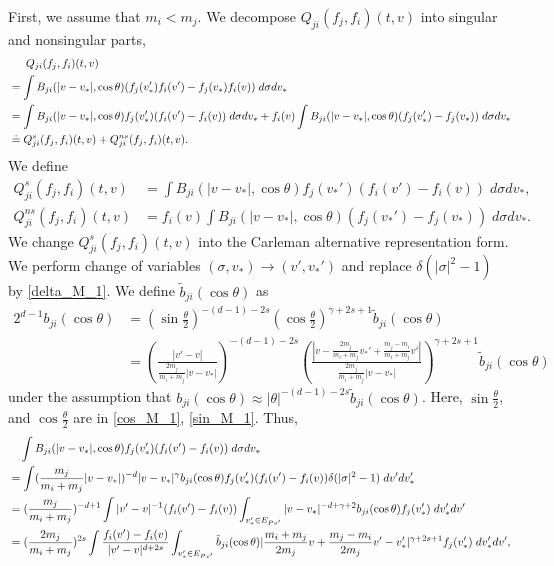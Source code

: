 \documentclass[reqno,10pt]{amsart}
\numberwithin{equation}{section}
\begin{document}
\noindent First, we assume that $m_i<m_j.$ We decompose $Q_{ji}(f_j,f_i)(t,v)$ into singular and nonsingular parts,
\begin{align} 
& \quad\;\; Q_{ji}(f_j,f_i)(t,v) \notag \\  &= \int B_{ji}(|v-v_*|,\cos\theta)(f_j(v_*')f_i(v')-f_j(v_*)f_i(v)) \; d\sigma dv_* \notag \\
 &=  \int B_{ji}(|v-v_*|,\cos\theta)f_j(v_*')(f_i(v')-f_i(v))\;d\sigma dv_* +  f_i(v)\int B_{ji}(|v-v_*|,\cos\theta)(f_j(v_*')-f_j(v_*)) \; d\sigma dv_* \notag \\
 &\doteq Q^{s}_{ji}(f_j,f_i)(t,v) + Q^{ns}_{ji}(f_j,f_i)(t,v).  \label{split_Q_M_1}
\end{align}
We define 
\begin{align}
    Q_{ji}^{s}(f_j,f_i)(t,v) &= \int B_{ji}(|v-v_*|,\cos\theta)f_j(v_*')(f_i(v')-f_i(v))\;d\sigma dv_* \label{Qs_M_1}, \\
    Q^{ns}_{ji}(f_j,f_i)(t,v) &= f_i(v)\int B_{ji}(|v-v_*|,\cos\theta)(f_j(v_*')-f_j(v_*)) \; d\sigma dv_*\label{Qns_M_1}.
\end{align}
We change $Q_{ji}^{s}(f_j,f_i)(t,v)$ into the Carleman alternative representation form. We perform change of variables $(\sigma, v_*) \rightarrow (v',v_*')$ and replace $\delta(|\sigma|^2-1)$ by \eqref{delta_M_1}. We define $\tilde{b}_{ji}(\cos\theta)$ as
\begin{align*}
    2^{d-1}b_{ji}(\cos\theta)&= (\sin\frac{\theta}{2})^{-(d-1)-2s}(\cos\frac{\theta}{2})^{\gamma+2s+1}\tilde{b}_{ji}(\cos\theta) \\ &= (\frac{|v'-v|}{\frac{2m_j}{m_i+m_j}|v-v_*|})^{-(d-1)-2s}(\frac{|v-\frac{2m_j}{m_i+m_j}v_*'+\frac{m_j-m_i}{m_i+m_j}v'|}{\frac{2m_j}{m_i+m_j}|v-v_*|})^{\gamma+2s+1} \tilde{b}_{ji}(\cos\theta)
\end{align*} under the assumption that $b_{ji}(\cos\theta)\approx|\theta|^{-(d-1)-2s}\tilde{b}_{ji}(\cos\theta)$. Here, $\sin {\frac{\theta}{2}}$, and $\cos {\frac{\theta}{2}}$ are in \eqref{cos_M_1}, \eqref{sin_M_1}. Thus,
\begin{align} 
    &\quad \int B_{ji}(|v-v_*|,\cos\theta)f_j(v_*')(f_i(v')-f_i(v))\;d\sigma dv_* \label{Qs_start_M_1} \\
     &=\int (\frac{m_j}{m_i+m_j}|v-v_*|)^{-d}|v-v_*|^{\gamma}b_{ji}(\cos\theta)f_j(v_*')(f_i(v')-f_i(v))\delta(|\sigma|^2-1) \; dv'dv_*' \notag \\ 
      &= (\frac{m_j}{m_i+m_j})^{-d+1}\int |v'-v|^{-1}(f_i(v')-f_i(v)) \int_{v_*'\in E_{Pv'}} |v-v_*|^{-d+\gamma+2}b_{ji}(\cos\theta)f_j(v_*')\; dv_*'dv' \notag \\ 
       &=(\frac{2m_j}{m_i+m_j})^{2s}\int \frac{f_i(v')-f_i(v)}{|v'-v|^{d+2s}}\int_{v_*'\in E_{Pv'}}  \tilde{b}_{ji} (\cos\theta) |\frac{m_i+m_j}{2m_j}v+\frac{m_j-m_i}{2m_j}v'-v_*'|^{\gamma+2s+1}f_j(v_*')\; dv_*'dv',\notag
\end{align}
\end{document}
